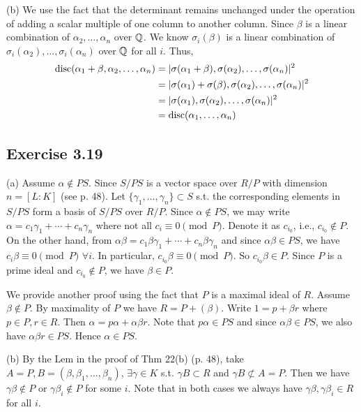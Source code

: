 \documentclass[../Marcus.tex]{subfiles}
\begin{document}
(b) We use the fact that the determinant remains unchanged under the operation of adding a scalar multiple of one column to another column. Since $\beta$ is a linear combination of $\alpha_2,\ldots,\alpha_n$ over $\mathbb{Q}$. We know $\sigma_i(\beta)$ is a linear combination of $\sigma_i(\alpha_2),\ldots,\sigma_i(\alpha_n)$ over $\mathbb{Q}$ for all $i$. Thus,
\begin{align*}
\operatorname{disc}(\alpha_1+\beta,\alpha_2,\ldots,\alpha_n) &= |\sigma(\alpha_1+\beta),\sigma(\alpha_2),\ldots,\sigma(\alpha_n)|^2 \\
&=|\sigma(\alpha_1)+\sigma(\beta),\sigma(\alpha_2),\ldots,\sigma(\alpha_n)|^2  \\
&= |\sigma(\alpha_1),\sigma(\alpha_2),\ldots,\sigma(\alpha_n)|^2 \\
&= \operatorname{disc}(\alpha_1,\ldots,\alpha_n)
\end{align*}

\subsection*{Exercise 3.19}

(a) Assume $\alpha\notin PS$. Since $S/PS$ is a vector space over $R/P$ with dimension $n=[L:K]$ (see p. 48). Let $\{\gamma_1,\ldots,\gamma_n\}\subset S$ s.t. the corresponding elements in $S/PS$ form a basis of $S/PS$ over $R/P$. Since $\alpha\notin PS$, we may write $\alpha=c_1\gamma_1+\cdots+c_n\gamma_n$ where not all $c_i \equiv 0 \pmod{P}$. Denote it as $c_{i_0}$, i.e., $c_{i_0}\notin P$. On the other hand, from $\alpha\beta=c_1\beta\gamma_1+\cdots+c_n\beta\gamma_n$ and since $\alpha\beta\in PS$, we have $c_i\beta \equiv 0 \pmod{P}$ $\forall i$. In particular, $c_{i_0}\beta\equiv 0 \pmod{P}$. So $c_{i_0}\beta\in P$. Since $P$ is a prime ideal and $c_{i_0}\notin P$, we have $\beta\in P$.

We provide another proof using the fact that $P$ is a maximal ideal of $R$. Assume $\beta\notin P$. By maximality of $P$ we have $R=P+(\beta)$. Write $1=p+\beta r$ where $p\in P,r\in R$. Then $\alpha=p \alpha+\alpha\beta r$. Note that $p\alpha\in PS$ and since $\alpha\beta\in PS$, we also have $\alpha\beta r\in PS$. Hence $\alpha\in PS$.

(b) By the Lem in the proof of Thm 22(b) (p. 48), take $A=P,B=(\beta,\beta_1,\ldots,\beta_n)$, $\exists\gamma\in K$ s.t. $\gamma B\subset R$ and $\gamma B \not\subset A=P$. Then we have $\gamma\beta\notin P$ or $\gamma\beta_i\notin P$ for some $i$. Note that in both cases we always have $\gamma\beta,\gamma\beta_i \in R$ for all $i$.
\end{document}

